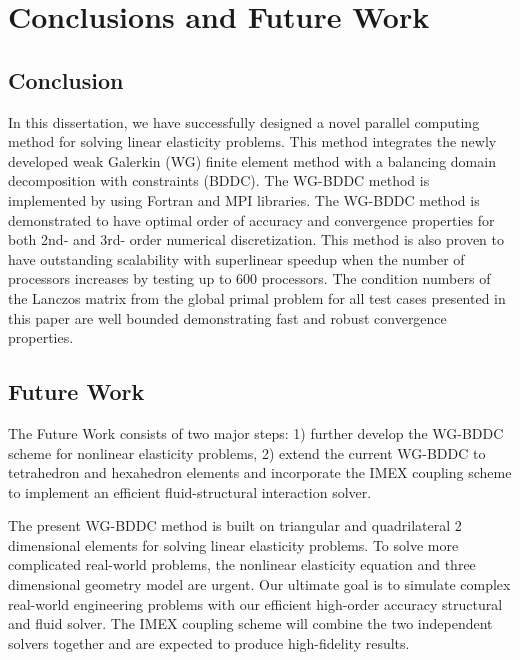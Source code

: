 \chapter{Conclusions and Future Work}

\section{Conclusion}

In this dissertation, we have successfully designed a novel parallel computing method for solving linear elasticity problems. This method integrates the newly developed weak Galerkin (WG) finite element method with a balancing domain decomposition with constraints (BDDC). The WG-BDDC method is implemented by using Fortran and MPI libraries. The WG-BDDC method is demonstrated to have optimal order of accuracy and convergence properties for both 2nd- and 3rd- order numerical discretization. This method is also proven to have outstanding scalability with superlinear speedup when the number of processors increases by testing up to 600 processors. The condition numbers of the Lanczos matrix from the global primal problem for all test cases presented in this paper are well bounded demonstrating fast and robust convergence properties.


\section{Future Work}

The Future Work consists of two major steps: 1) further develop the WG-BDDC scheme for nonlinear elasticity problems, 2) extend the current WG-BDDC to tetrahedron and hexahedron elements and incorporate the IMEX coupling scheme to implement an efficient fluid-structural interaction solver.

The present WG-BDDC method is built on triangular and quadrilateral 2 dimensional elements for solving linear elasticity problems. To solve more complicated real-world problems, the nonlinear elasticity equation and three dimensional geometry model are urgent. Our ultimate goal is to simulate complex real-world engineering problems with our efficient high-order accuracy structural and fluid solver. The IMEX coupling scheme will combine the two independent solvers together and are expected to produce high-fidelity results.